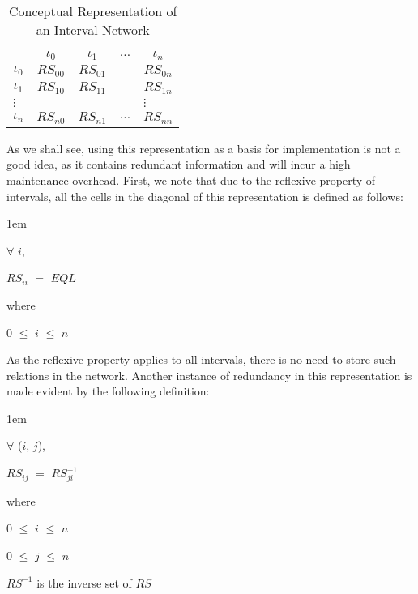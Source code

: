 \documentclass[11pt]{report}
\newenvironment{vquote}
{
  \begin{list}{}{\leftmargin 1em}\item[]
}
{
  \end{list}
}
\begin{document}
        \begin{table}[tbhp]
          \begin{center}
            \begin{tabular}[t]{|c|c|c|c|c|}
              \cline{1-3}
              \cline{5-5}
              & $\iota_0$ & $\iota_1$ & $\ldots$ & $\iota_n$ \\
              \cline{1-3}
              \cline{5-5}
              $\iota_0$ & $RS_{00}$ & $RS_{01}$ & & $RS_{0n}$ \\
              \cline{1-3}
              \cline{5-5}
              $\iota_1$ & $RS_{10}$ & $RS_{11}$ & & $RS_{1n}$ \\
              \cline{1-3}
              \cline{5-5}
              \multicolumn{4}{l}{$\vdots$} & \multicolumn{1}{l}{$\vdots$} \\
              \cline{1-3}
              \cline{5-5}
              $\iota_n$ & $RS_{n0}$ & $RS_{n1}$ & $\ldots$ & $RS_{nn}$ \\
              \cline{1-3}
              \cline{5-5}
            \end{tabular}
          \end{center}
          \caption{Conceptual Representation of an Interval Network}
          \label{tabl-impln-concp}
        \end{table}

        As we shall see, using this representation as a basis for
        implementation is not a good idea, as it contains redundant information
        and will incur a high maintenance overhead. First, we note that due
        to the reflexive property of intervals, all the cells in the diagonal
        of this representation is defined as follows:

        \begin{vquote}
          $\forall$ $i$,

          $RS_{ii}$ $=$ {$EQL$}

          where

          \hspace{1em}
          $0$ $\leq$ $i$ $\leq$ $n$
        \end{vquote}

        As the reflexive property applies to all intervals, there is no need to
        store such relations in the network. Another instance of redundancy in
        this representation is made evident by the following definition:

        \begin{vquote}
          $\forall$ ($i$, $j$),

          $RS_{ij}$ $=$ $RS^{-1}_{ji}$

          where

          \hspace{1em}
          $0$ $\leq$ $i$ $\leq$ $n$

          \hspace{1em}
          $0$ $\leq$ $j$ $\leq$ $n$

          \hspace{1em}
          $RS^{-1}$ is the inverse set of $RS$
        \end{vquote}
\end{document}
